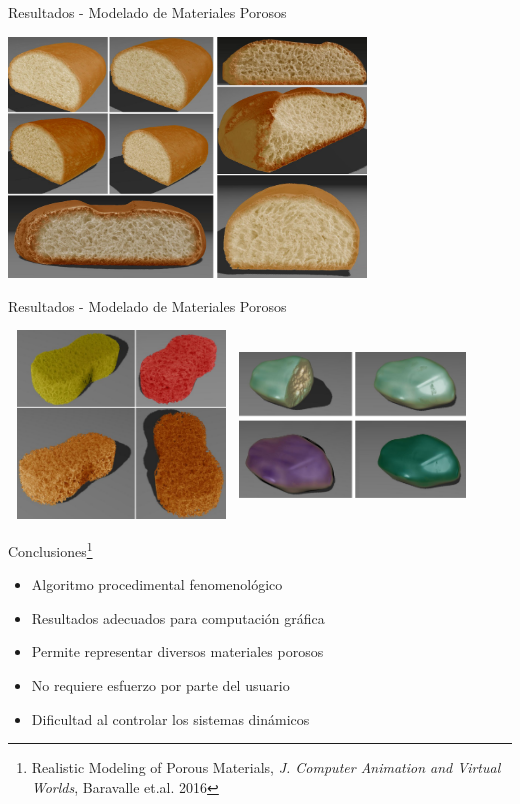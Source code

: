 \documentclass[spanish,unknownkeysallowed,10pt]{beamer}
\begin{document}
\begin{frame}{Resultados - Modelado de Materiales Porosos}

\centerline{\includegraphics[width=9.5cm]{../figures/Fig12CAVW}}
\end{frame}

\begin{frame}{Resultados - Modelado de Materiales Porosos}

\includegraphics[width=6cm, height=5cm]{../figures/Fig13CAVW}
\includegraphics[width=6cm, height=5cm]{../figures/Fig14CAVW}

\end{frame}


\begin{frame}{Conclusiones\footnote{Realistic Modeling of Porous Materials, {\it J. Computer Animation and Virtual Worlds}, Baravalle et.al. 2016}}
\begin{block}{}
\begin{itemize}
\item Algoritmo procedimental fenomenológico
\item Resultados adecuados para computación gráfica
\item Permite representar diversos materiales porosos
\item No requiere esfuerzo por parte del usuario

\item Dificultad al controlar los sistemas dinámicos
\end{itemize}
\end{block}
\end{frame}
\end{document}
